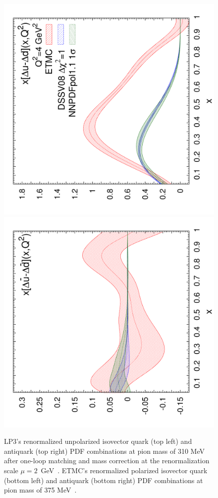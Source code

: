 \begin{figure}[!t]
\includegraphics[scale=0.22,angle=270]{plots/polxq}
\includegraphics[scale=0.22,angle=270]{plots/polxqbar}\\
\caption{\small LP3's renormalized unpolarized isovector quark (top left) and 
  antiquark (top right) PDF combinations at pion mass of 310 MeV after 
  one-loop matching and mass correction at the renormalization scale 
  $\mu=2$~GeV~\cite{Chen:2017mzz}. 
  ETMC's renormalized polarized isovector quark (bottom left) and antiquark
  (bottom right) PDF combinations at pion mass of 
  375 MeV~\cite{Alexandrou:2017huk}.} 
\label{fig:qPDF-demo}
\end{figure}

